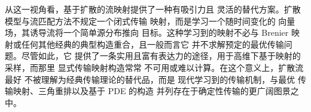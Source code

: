 从这一视角看，基于扩散的流映射提供了一种有吸引力且
灵活的替代方案。扩散模型与流匹配方法不规定一个闭式传输
映射，而是学习一个随时间变化的
向量场，其诱导流将一个简单源分布推向
目标。这种学习到的映射不必与 Brenier
映射或任何其他经典的典型构造重合，且一般而言它
并不求解预定的最优传输问题。尽管如此，它
提供了一条实用且富有表达力的途径，用于高维下基于映射的采样，而那里
显式传输映射构造常常
不可用或难以计算。在这个意义上，扩散流最好
不被理解为经典传输理论的替代品，而是
现代学习到的传输机制，与最优
传输映射、三角重排以及基于 PDE 的构造
并列存在于确定性传输的更广阔图景之中。
\newpage

